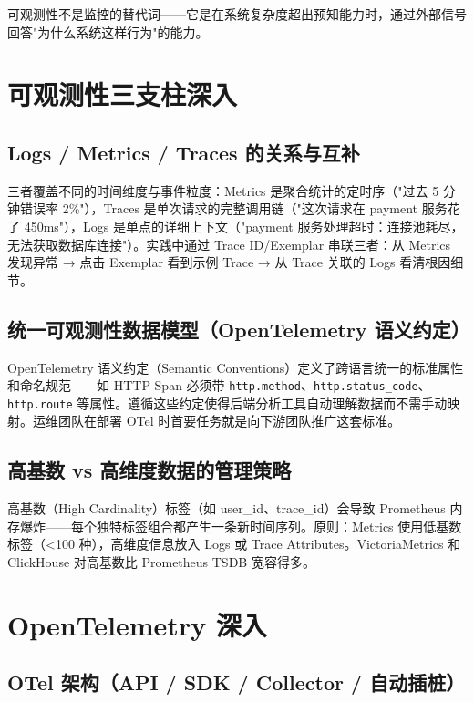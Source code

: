 \documentclass[12pt,UTF8]{ctexbook}
\begin{document}
可观测性不是监控的替代词——它是在系统复杂度超出预知能力时，通过外部信号回答"为什么系统这样行为"的能力。

  \section{可观测性三支柱深入}
    \subsection{Logs / Metrics / Traces 的关系与互补}

三者覆盖不同的时间维度与事件粒度：Metrics 是聚合统计的定时序（"过去 5 分钟错误率 2\%"），Traces 是单次请求的完整调用链（"这次请求在 payment 服务花了 450ms"），Logs 是单点的详细上下文（"payment 服务处理超时：连接池耗尽，无法获取数据库连接"）。实践中通过 Trace ID/Exemplar 串联三者：从 Metrics 发现异常 → 点击 Exemplar 看到示例 Trace → 从 Trace 关联的 Logs 看清根因细节。

    \subsection{统一可观测性数据模型（OpenTelemetry 语义约定）}

OpenTelemetry 语义约定（Semantic Conventions）定义了跨语言统一的标准属性和命名规范——如 HTTP Span 必须带 \texttt{http.method}、\texttt{http.status\_code}、\texttt{http.route} 等属性。遵循这些约定使得后端分析工具自动理解数据而不需手动映射。运维团队在部署 OTel 时首要任务就是向下游团队推广这套标准。

    \subsection{高基数 vs 高维度数据的管理策略}

高基数（High Cardinality）标签（如 user\_id、trace\_id）会导致 Prometheus 内存爆炸——每个独特标签组合都产生一条新时间序列。原则：Metrics 使用低基数标签（<100 种），高维度信息放入 Logs 或 Trace Attributes。VictoriaMetrics 和 ClickHouse 对高基数比 Prometheus TSDB 宽容得多。

  \section{OpenTelemetry 深入}
    \subsection{OTel 架构（API / SDK / Collector / 自动插桩）}
\end{document}
